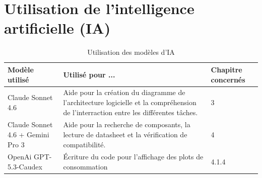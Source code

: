 \chapter*{Utilisation de l'intelligence artificielle (IA)}

\begin{table}[h]
    \centering
    \caption{Utilisation des modèles d'IA}
    \renewcommand{\arraystretch}{1.2}
    \begin{tabular}{|p{}|p{}|p{}|}
        \hline
        \textbf{Modèle utilisé}          & \textbf{Utilisé pour ...}                                                                                                           & \textbf{Chapitre concernés} \\
        \hline
        Claude Sonnet 4.6                & Aide pour la création du diagramme de l'architecture logicielle et la compréhension de l'interraction entre les différentes tâches. & 3                           \\
        \hline
        Claude Sonnet 4.6 + Gemini Pro 3 & Aide pour la recherche de composants, la lecture de datasheet et la vérification de compatibilité.                                  & 4                           \\
        \hline
        OpenAi GPT-5.3-Caudex            & Écriture du code pour l'affichage des plots de consommation                                                                         & 4.1.4                       \\
        \hline
    \end{tabular}
\end{table}